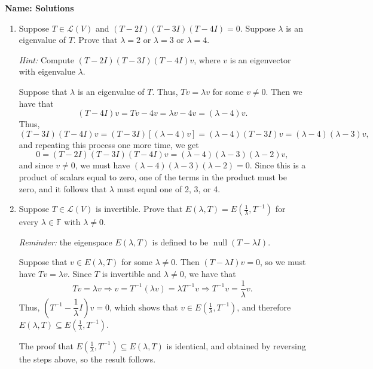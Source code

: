 \documentclass[12pt]{article}
\newcommand{\points}[1]{\marginpar{\hspace{24pt}[#1]}}
\DeclareMathOperator{\nul}{null}
\begin{document}
\thispagestyle{fancy}
{\bf Name: Solutions}

\bigskip


 \begin{enumerate}
 \item Suppose $T\in\mathcal{L}(V)$ and $(T-2I)(T-3I)(T-4I)=0$. Suppose $\lambda$ is an eigenvalue of $T$. Prove that $\lambda =2$ or $\lambda =3$ or $\lambda=4$.\points{5}

{\em Hint:} Compute $(T-2I)(T-3I)(T-4I)v$, where $v$ is an eigenvector with eigenvalue $\lambda$.

\bigskip

Suppose that $\lambda$ is an eigenvalue of $T$. Thus, $Tv=\lambda v$ for some $v\neq 0$. Then we have that
\[
 (T-4I)v = Tv-4v = \lambda v-4v = (\lambda-4)v.
\]
Thus, 
\[
 (T-3I)(T-4I)v = (T-3I)[(\lambda-4)v] = (\lambda-4)(T-3I)v = (\lambda -4)(\lambda -3)v,
\]
and repeating this process one more time, we get
\[
 0 = (T-2I)(T-3I)(T-4I)v = (\lambda-4)(\lambda-3)(\lambda-2)v,
\]
and since $v\neq 0$, we must have $(\lambda-4)(\lambda-3)(\lambda-2)=0$. Since this is a product of scalars equal to zero, one of the terms in the product must be zero, and it follows that $\lambda$ must equal one of 2, 3, or 4.

\bigskip

 \item Suppose $T\in\mathcal{L}(V)$ is invertible. Prove that $E(\lambda, T)=E(\frac{1}{\lambda},T^{-1})$ for every $\lambda\in\mathbb{F}$ with $\lambda\neq 0$.\points{5}

{\em Reminder:} the eigenspace $E(\lambda, T)$ is defined to be $\nul(T-\lambda I)$.

\bigskip

Suppose that $v\in E(\lambda, T)$ for some $\lambda\neq 0$. Then $(T-\lambda I)v=0$, so we must have $Tv=\lambda v$. Since $T$ is invertible and $\lambda\neq 0$, we have that
\[
 Tv=\lambda v \Rightarrow v=T^{-1}(\lambda v) = \lambda T^{-1}v \Rightarrow T^{-1}v = \frac{1}{\lambda}v.
\]
Thus, $\left(T^{-1}-\dfrac{1}{\lambda}I\right)v = 0$, which shows that $v\in E(\frac{1}{\lambda}, T^{-1})$, and therefore $E(\lambda, T)\subseteq E(\frac{1}{\lambda},T^{-1})$.

The proof that $E(\frac{1}{\lambda},T^{-1})\subseteq E(\lambda, T)$ is identical, and obtained by reversing the steps above, so the result follows.
 \end{enumerate}
\end{document}
